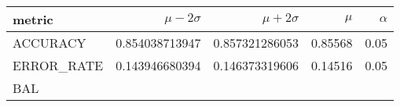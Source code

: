 \documentclass[11pt]{report}
\begin{document}
\begin{table}
    \centering
    \begin{tabular}{lrrrr}
    \hline
    
        \textbf{ metric }
        
           &
        
    
        \textbf{ $\mu - 2\sigma$ }
        
           &
        
    
        \textbf{ $\mu + 2\sigma$ }
        
           &
        
    
        \textbf{ $\mu$ }
        
           &
        
    
        \textbf{ $\alpha$ }
        
     
    \\
    \hline
    
        
            ACCURACY
             
               &
            
        
            0.854038713947
             
               &
            
        
            0.857321286053
             
               &
            
        
            0.85568
             
               &
            
        
            0.05
            
        
        \\
    
        
            ERROR\_RATE
             
               &
            
        
            0.143946680394
             
               &
            
        
            0.146373319606
             
               &
            
        
            0.14516
             
               &
            
        
            0.05
            
        
        \\
    
        
            BAL
             

\end{tabular}
\end{table}
\end{document}
